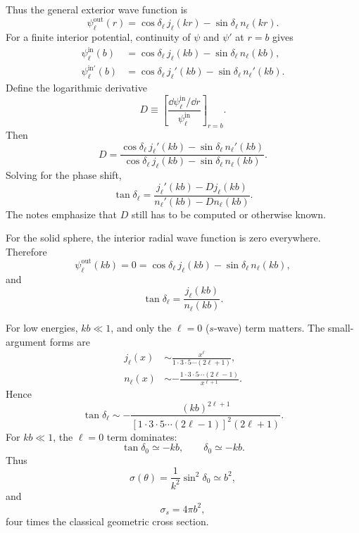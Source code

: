 Thus the general exterior wave function is
\begin{equation*}
  \psi_\ell^{\mathrm{out}}(r)
  =\cos\delta_\ell\,j_\ell(kr)
  -\sin\delta_\ell\,n_\ell(kr).
  \tag{17}
\end{equation*}
For a finite interior potential, continuity of $\psi$ and $\psi'$ at $r=b$ gives
\begin{align*}
  \psi_\ell^{\mathrm{in}}(b)
  &=\cos\delta_\ell\,j_\ell(kb)
  -\sin\delta_\ell\,n_\ell(kb),\\
  \psi_\ell^{\mathrm{in}\prime}(b)
  &=\cos\delta_\ell\,j_\ell'(kb)
  -\sin\delta_\ell\,n_\ell'(kb).
\end{align*}
Define the logarithmic derivative
\begin{equation*}
  D\equiv\left[\frac{\dd\psi_\ell^{\mathrm{in}}/\dd r}
  {\psi_\ell^{\mathrm{in}}}\right]_{r=b}.
  \tag{18}
\end{equation*}
Then
\begin{equation*}
  D=\frac{\cos\delta_\ell\,j_\ell'(kb)-\sin\delta_\ell\,n_\ell'(kb)}
  {\cos\delta_\ell\,j_\ell(kb)-\sin\delta_\ell\,n_\ell(kb)}.
  \tag{19}
\end{equation*}
Solving for the phase shift,
\begin{equation*}
  \tan\delta_\ell
  =\frac{j_\ell'(kb)-D j_\ell(kb)}
  {n_\ell'(kb)-D n_\ell(kb)}.
  \tag{20}
\end{equation*}
The notes emphasize that $D$ still has to be computed or otherwise known.

For the solid sphere, the interior radial wave function is zero everywhere.  Therefore
\[
  \psi_\ell^{\mathrm{out}}(kb)=0
  =\cos\delta_\ell\,j_\ell(kb)-\sin\delta_\ell\,n_\ell(kb),
\]
and
\begin{equation*}
  \tan\delta_\ell=\frac{j_\ell(kb)}{n_\ell(kb)}.
  \tag{21}\label{eq:rt1-hard-sphere-phase}
\end{equation*}

For low energies, $kb\ll1$, and only the $\ell=0$ ($s$-wave) term matters.  The small-argument forms are
\begin{align*}
  j_\ell(x)&\sim\frac{x^\ell}{1\cdot3\cdot5\cdots(2\ell+1)},\\
  n_\ell(x)&\sim-\frac{1\cdot3\cdot5\cdots(2\ell-1)}{x^{\ell+1}}.
  \tag{22}
\end{align*}
Hence
\begin{equation*}
  \tan\delta_\ell
  \sim-\frac{(kb)^{2\ell+1}}
  {\left[1\cdot3\cdot5\cdots(2\ell-1)\right]^2(2\ell+1)}.
  \tag{23}
\end{equation*}
For $kb\ll1$, the $\ell=0$ term dominates:
\[
  \tan\delta_0\simeq-kb,
  \qquad
  \delta_0\simeq-kb.
\]
Thus
\begin{equation*}
  \sigma(\theta)=\frac{1}{k^2}\sin^2\delta_0\simeq b^2,
  \tag{24}
\end{equation*}
and
\begin{equation*}
  \sigma_s=4\pi b^2,
  \tag{25}
\end{equation*}
four times the classical geometric cross section.

